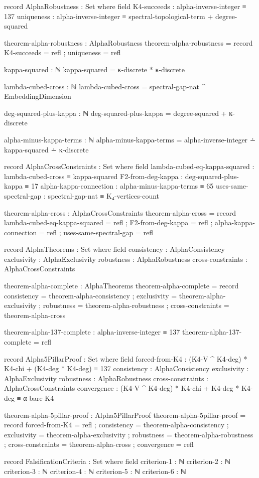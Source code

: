 \documentclass[11pt,a4paper]{book}
\begin{document}
\begin{code}
record AlphaRobustness : Set where
  field
    K4-succeeds : alpha-inverse-integer ≡ 137
    uniqueness  : alpha-inverse-integer ≡ spectral-topological-term + degree-squared

theorem-alpha-robustness : AlphaRobustness
theorem-alpha-robustness = record
  { K4-succeeds = refl
  ; uniqueness  = refl
  }

kappa-squared : ℕ
kappa-squared = κ-discrete * κ-discrete

lambda-cubed-cross : ℕ
lambda-cubed-cross = spectral-gap-nat ^ EmbeddingDimension

deg-squared-plus-kappa : ℕ
deg-squared-plus-kappa = degree-squared + κ-discrete

alpha-minus-kappa-terms : ℕ
alpha-minus-kappa-terms = alpha-inverse-integer ∸ kappa-squared ∸ κ-discrete

record AlphaCrossConstraints : Set where
  field
    lambda-cubed-eq-kappa-squared : lambda-cubed-cross ≡ kappa-squared
    F2-from-deg-kappa            : deg-squared-plus-kappa ≡ 17
    alpha-kappa-connection       : alpha-minus-kappa-terms ≡ 65
    uses-same-spectral-gap       : spectral-gap-nat ≡ K₄-vertices-count

theorem-alpha-cross : AlphaCrossConstraints
theorem-alpha-cross = record
  { lambda-cubed-eq-kappa-squared = refl
  ; F2-from-deg-kappa            = refl
  ; alpha-kappa-connection       = refl
  ; uses-same-spectral-gap       = refl
  }

record AlphaTheorems : Set where
  field
    consistency       : AlphaConsistency
    exclusivity       : AlphaExclusivity
    robustness        : AlphaRobustness
    cross-constraints : AlphaCrossConstraints

theorem-alpha-complete : AlphaTheorems
theorem-alpha-complete = record
  { consistency       = theorem-alpha-consistency
  ; exclusivity       = theorem-alpha-exclusivity
  ; robustness        = theorem-alpha-robustness
  ; cross-constraints = theorem-alpha-cross
  }

theorem-alpha-137-complete : alpha-inverse-integer ≡ 137
theorem-alpha-137-complete = refl

record Alpha5PillarProof : Set where
  field
    forced-from-K4      : (K4-V ^ K4-deg) * K4-chi + (K4-deg * K4-deg) ≡ 137
    consistency         : AlphaConsistency
    exclusivity         : AlphaExclusivity
    robustness          : AlphaRobustness
    cross-constraints   : AlphaCrossConstraints
    convergence         : (K4-V ^ K4-deg) * K4-chi + K4-deg * K4-deg ≡ α-bare-K4

theorem-alpha-5pillar-proof : Alpha5PillarProof
theorem-alpha-5pillar-proof = record
  { forced-from-K4    = refl
  ; consistency       = theorem-alpha-consistency
  ; exclusivity       = theorem-alpha-exclusivity
  ; robustness        = theorem-alpha-robustness
  ; cross-constraints = theorem-alpha-cross
  ; convergence       = refl
  }

record FalsificationCriteria : Set where
  field
    criterion-1 : ℕ
    criterion-2 : ℕ
    criterion-3 : ℕ
    criterion-4 : ℕ
    criterion-5 : ℕ
    criterion-6 : ℕ
\end{code}
\end{document}
